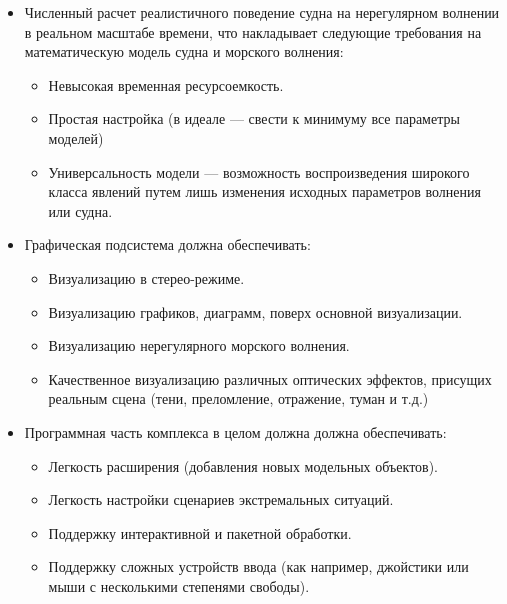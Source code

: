 \begin{itemize}

	\item	Численный расчет реалистичного поведение судна на нерегулярном волнении 
			в реальном масштабе времени, 
			что накладывает следующие требования на математическую модель судна и морского волнения:
			\begin{itemize}
				\item	Невысокая временная ресурсоемкость.
				\item	Простая настройка (в идеале --- свести к минимуму все 
						 параметры моделей)
				\item	Универсальность модели --- возможность воспроизведения 
						широкого класса явлений путем лишь изменения исходных 
						параметров волнения или судна.
			\end{itemize}
	
	\item	Графическая подсистема должна обеспечивать:
			\begin{itemize}
				\item	Визуализацию в стерео-режиме.
				\item	Визуализацию графиков, диаграмм, поверх основной визуализации.
				\item	Визуализацию нерегулярного морского волнения.
				\item	Качественное визуализацию различных оптических эффектов, присущих 
						реальным сцена (тени, преломление, отражение, туман и т.д.)
			\end{itemize}
			
	\item	Программная часть комплекса в целом должна должна обеспечивать:
			\begin{itemize}
				\item 	Легкость расширения (добавления новых модельных объектов).
				\item 	Легкость настройки сценариев экстремальных ситуаций.
				\item 	Поддержку интерактивной и пакетной обработки.
				\item	Поддержку сложных устройств ввода 
						(как например, джойстики или  мыши с 
						несколькими степенями свободы).
			\end{itemize}
\end{itemize}


